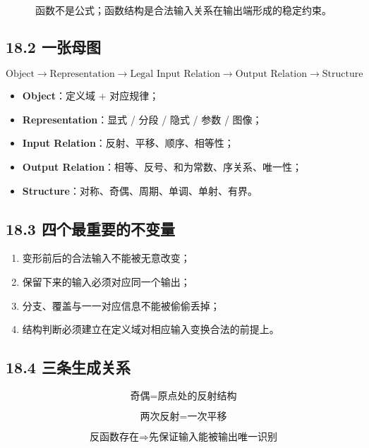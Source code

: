 \documentclass[11pt,a4paper]{ctexart}
\providecommand{\tightlist}{}
\begin{document}
\[
\boxed{
\text{函数不是公式；函数结构是合法输入关系在输出端形成的稳定约束。}
}
\]

\subsection{18.2 一张母图}\label{ux4e00ux5f20ux6bcdux56fe}

\[
\boxed{
\text{Object}
\to
\text{Representation}
\to
\text{Legal Input Relation}
\to
\text{Output Relation}
\to
\text{Structure}
}
\]

\begin{itemize}
\tightlist
\item
  \textbf{Object}：定义域 + 对应规律；
\item
  \textbf{Representation}：显式 / 分段 / 隐式 / 参数 / 图像；
\item
  \textbf{Input Relation}：反射、平移、顺序、相等性；
\item
  \textbf{Output Relation}：相等、反号、和为常数、序关系、唯一性；
\item
  \textbf{Structure}：对称、奇偶、周期、单调、单射、有界。
\end{itemize}

\subsection{18.3
四个最重要的不变量}\label{ux56dbux4e2aux6700ux91cdux8981ux7684ux4e0dux53d8ux91cf}

\begin{enumerate}
\def\labelenumi{\arabic{enumi}.}
\tightlist
\item
  变形前后的合法输入不能被无意改变；
\item
  保留下来的输入必须对应同一个输出；
\item
  分支、覆盖与一一对应信息不能被偷偷丢掉；
\item
  结构判断必须建立在定义域对相应输入变换合法的前提上。
\end{enumerate}

\subsection{18.4
三条生成关系}\label{ux4e09ux6761ux751fux6210ux5173ux7cfb}

\[
\boxed{\text{奇偶}=\text{原点处的反射结构}}
\]

\[
\boxed{\text{两次反射}=\text{一次平移}}
\]

\[
\boxed{\text{反函数存在}\Rightarrow\text{先保证输入能被输出唯一识别}}
\]
\end{document}
